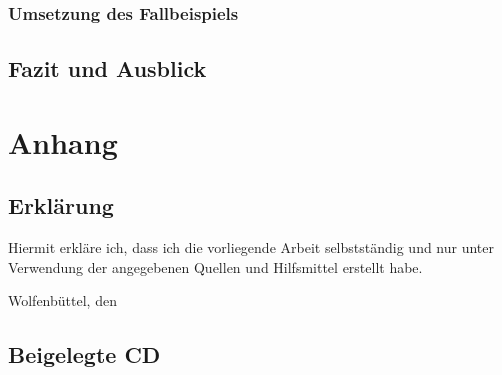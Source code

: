 \documentclass[
  a4paper,					    %
  twoside,
  DIV=calc,     				%
  bibliography=totoc,
  cleardoublepage=empty,
  ngerman,     					%
  final       					%
]{scrbook}
\begin{document}
\section{Umsetzung des Fallbeispiels}
\label{sec:FallbeispielUmsetzung}










\chapter{Fazit und Ausblick}
\label{sec:FazitAusblick}










\backmatter
\appendix
\part*{Anhang}


\chapter{Erklärung}
\label{sec:Erklärung}
Hiermit erkläre ich, dass ich die vorliegende Arbeit selbstständig und nur unter Verwendung der angegebenen Quellen und Hilfsmittel erstellt habe.
\vspace{2.5cm} \par
Wolfenbüttel, den %


\chapter{Beigelegte CD}
\label{sec:BeigelegteCD}



%
\nocite{*}
%
\begin{singlespace}

\end{singlespace}
\end{document}
